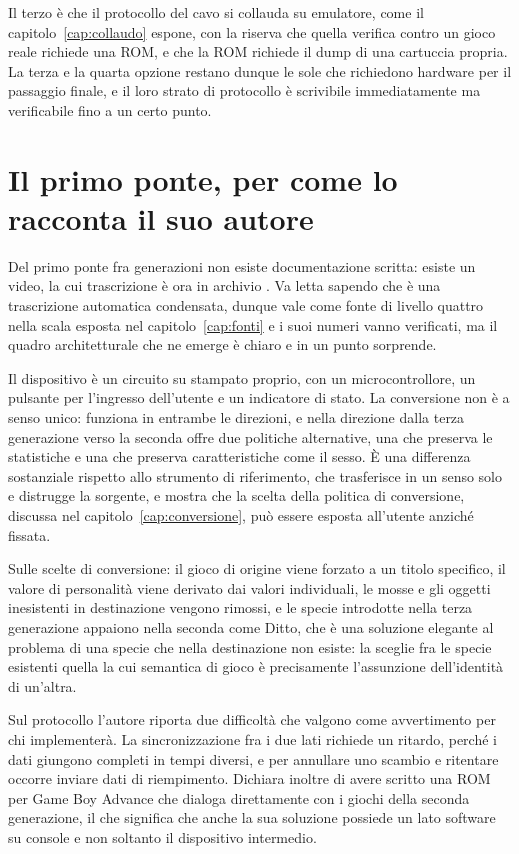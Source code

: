 Il terzo è che il protocollo del cavo si collauda su emulatore, come il capitolo~\ref{cap:collaudo} espone, con la riserva che quella verifica contro un gioco reale richiede una ROM, e che la ROM richiede il dump di una cartuccia propria. La terza e la quarta opzione restano dunque le sole che richiedono hardware per il passaggio finale, e il loro strato di protocollo è scrivibile immediatamente ma verificabile fino a un certo punto.

\section{Il primo ponte, per come lo racconta il suo autore}

Del primo ponte fra generazioni non esiste documentazione scritta: esiste un video, la cui trascrizione è ora in archivio \cite{video-goppier}. Va letta sapendo che è una trascrizione automatica condensata, dunque vale come fonte di livello quattro nella scala esposta nel capitolo~\ref{cap:fonti} e i suoi numeri vanno verificati, ma il quadro architetturale che ne emerge è chiaro e in un punto sorprende.

Il dispositivo è un circuito su stampato proprio, con un microcontrollore, un pulsante per l'ingresso dell'utente e un indicatore di stato. La conversione non è a senso unico: funziona in entrambe le direzioni, e nella direzione dalla terza generazione verso la seconda offre due politiche alternative, una che preserva le statistiche e una che preserva caratteristiche come il sesso. È una differenza sostanziale rispetto allo strumento di riferimento, che trasferisce in un senso solo e distrugge la sorgente, e mostra che la scelta della politica di conversione, discussa nel capitolo~\ref{cap:conversione}, può essere esposta all'utente anziché fissata.

Sulle scelte di conversione: il gioco di origine viene forzato a un titolo specifico, il valore di personalità viene derivato dai valori individuali, le mosse e gli oggetti inesistenti in destinazione vengono rimossi, e le specie introdotte nella terza generazione appaiono nella seconda come Ditto, che è una soluzione elegante al problema di una specie che nella destinazione non esiste: la sceglie fra le specie esistenti quella la cui semantica di gioco è precisamente l'assunzione dell'identità di un'altra.

Sul protocollo l'autore riporta due difficoltà che valgono come avvertimento per chi implementerà. La sincronizzazione fra i due lati richiede un ritardo, perché i dati giungono completi in tempi diversi, e per annullare uno scambio e ritentare occorre inviare dati di riempimento. Dichiara inoltre di avere scritto una ROM per Game Boy Advance che dialoga direttamente con i giochi della seconda generazione, il che significa che anche la sua soluzione possiede un lato software su console e non soltanto il dispositivo intermedio.

